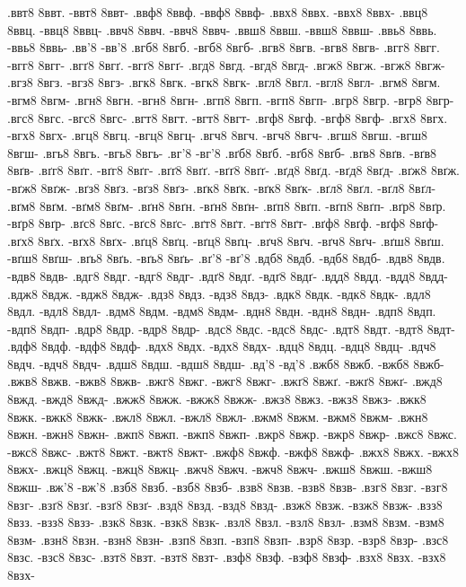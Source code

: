 {.ввт8 8ввт. -ввт8 8ввт-
.ввф8 8ввф. -ввф8 8ввф-
.ввх8 8ввх. -ввх8 8ввх-
.ввц8 8ввц. -ввц8 8ввц-
.ввч8 8ввч. -ввч8 8ввч-
.ввш8 8ввш. -ввш8 8ввш-
.ввь8 8ввь. -ввь8 8ввь-
.вв'8 -вв'8
.вгб8 8вгб. -вгб8 8вгб-
.вгв8 8вгв. -вгв8 8вгв-
.вгг8 8вгг. -вгг8 8вгг-
.вгґ8 8вгґ. -вгґ8 8вгґ-
.вгд8 8вгд. -вгд8 8вгд-
.вгж8 8вгж. -вгж8 8вгж-
.вгз8 8вгз. -вгз8 8вгз-
.вгк8 8вгк. -вгк8 8вгк-
.вгл8 8вгл. -вгл8 8вгл-
.вгм8 8вгм. -вгм8 8вгм-
.вгн8 8вгн. -вгн8 8вгн-
.вгп8 8вгп. -вгп8 8вгп-
.вгр8 8вгр. -вгр8 8вгр-
.вгс8 8вгс. -вгс8 8вгс-
.вгт8 8вгт. -вгт8 8вгт-
.вгф8 8вгф. -вгф8 8вгф-
.вгх8 8вгх. -вгх8 8вгх-
.вгц8 8вгц. -вгц8 8вгц-
.вгч8 8вгч. -вгч8 8вгч-
.вгш8 8вгш. -вгш8 8вгш-
.вгь8 8вгь. -вгь8 8вгь-
.вг'8 -вг'8
.вґб8 8вґб. -вґб8 8вґб-
.вґв8 8вґв. -вґв8 8вґв-
.вґг8 8вґг. -вґг8 8вґг-
.вґґ8 8вґґ. -вґґ8 8вґґ-
.вґд8 8вґд. -вґд8 8вґд-
.вґж8 8вґж. -вґж8 8вґж-
.вґз8 8вґз. -вґз8 8вґз-
.вґк8 8вґк. -вґк8 8вґк-
.вґл8 8вґл. -вґл8 8вґл-
.вґм8 8вґм. -вґм8 8вґм-
.вґн8 8вґн. -вґн8 8вґн-
.вґп8 8вґп. -вґп8 8вґп-
.вґр8 8вґр. -вґр8 8вґр-
.вґс8 8вґс. -вґс8 8вґс-
.вґт8 8вґт. -вґт8 8вґт-
.вґф8 8вґф. -вґф8 8вґф-
.вґх8 8вґх. -вґх8 8вґх-
.вґц8 8вґц. -вґц8 8вґц-
.вґч8 8вґч. -вґч8 8вґч-
.вґш8 8вґш. -вґш8 8вґш-
.вґь8 8вґь. -вґь8 8вґь-
.вґ'8 -вґ'8
.вдб8 8вдб. -вдб8 8вдб-
.вдв8 8вдв. -вдв8 8вдв-
.вдг8 8вдг. -вдг8 8вдг-
.вдґ8 8вдґ. -вдґ8 8вдґ-
.вдд8 8вдд. -вдд8 8вдд-
.вдж8 8вдж. -вдж8 8вдж-
.вдз8 8вдз. -вдз8 8вдз-
.вдк8 8вдк. -вдк8 8вдк-
.вдл8 8вдл. -вдл8 8вдл-
.вдм8 8вдм. -вдм8 8вдм-
.вдн8 8вдн. -вдн8 8вдн-
.вдп8 8вдп. -вдп8 8вдп-
.вдр8 8вдр. -вдр8 8вдр-
.вдс8 8вдс. -вдс8 8вдс-
.вдт8 8вдт. -вдт8 8вдт-
.вдф8 8вдф. -вдф8 8вдф-
.вдх8 8вдх. -вдх8 8вдх-
.вдц8 8вдц. -вдц8 8вдц-
.вдч8 8вдч. -вдч8 8вдч-
.вдш8 8вдш. -вдш8 8вдш-
.вд'8 -вд'8
.вжб8 8вжб. -вжб8 8вжб-
.вжв8 8вжв. -вжв8 8вжв-
.вжг8 8вжг. -вжг8 8вжг-
.вжґ8 8вжґ. -вжґ8 8вжґ-
.вжд8 8вжд. -вжд8 8вжд-
.вжж8 8вжж. -вжж8 8вжж-
.вжз8 8вжз. -вжз8 8вжз-
.вжк8 8вжк. -вжк8 8вжк-
.вжл8 8вжл. -вжл8 8вжл-
.вжм8 8вжм. -вжм8 8вжм-
.вжн8 8вжн. -вжн8 8вжн-
.вжп8 8вжп. -вжп8 8вжп-
.вжр8 8вжр. -вжр8 8вжр-
.вжс8 8вжс. -вжс8 8вжс-
.вжт8 8вжт. -вжт8 8вжт-
.вжф8 8вжф. -вжф8 8вжф-
.вжх8 8вжх. -вжх8 8вжх-
.вжц8 8вжц. -вжц8 8вжц-
.вжч8 8вжч. -вжч8 8вжч-
.вжш8 8вжш. -вжш8 8вжш-
.вж'8 -вж'8
.взб8 8взб. -взб8 8взб-
.взв8 8взв. -взв8 8взв-
.взг8 8взг. -взг8 8взг-
.взґ8 8взґ. -взґ8 8взґ-
.взд8 8взд. -взд8 8взд-
.взж8 8взж. -взж8 8взж-
.взз8 8взз. -взз8 8взз-
.взк8 8взк. -взк8 8взк-
.взл8 8взл. -взл8 8взл-
.взм8 8взм. -взм8 8взм-
.взн8 8взн. -взн8 8взн-
.взп8 8взп. -взп8 8взп-
.взр8 8взр. -взр8 8взр-
.взс8 8взс. -взс8 8взс-
.взт8 8взт. -взт8 8взт-
.взф8 8взф. -взф8 8взф-
.взх8 8взх. -взх8 8взх-
}

